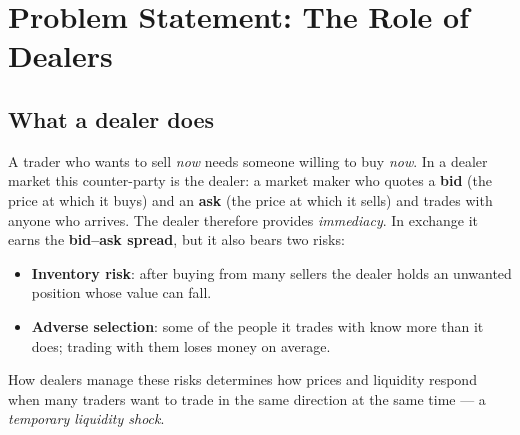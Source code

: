 \documentclass[11pt,a4paper]{article}
\begin{document}
\section{Problem Statement: The Role of Dealers}
\label{sec:problem}

\subsection{What a dealer does}
A trader who wants to sell \emph{now} needs someone willing to buy \emph{now}. In a dealer market this
counter-party is the dealer: a market maker who quotes a \textbf{bid} (the price at which it buys) and an
\textbf{ask} (the price at which it sells) and trades with anyone who arrives. The dealer therefore provides
\emph{immediacy}. In exchange it earns the \textbf{bid--ask spread}, but it also bears two risks:
\begin{itemize}
  \item \textbf{Inventory risk}: after buying from many sellers the dealer holds an unwanted position whose
        value can fall.
  \item \textbf{Adverse selection}: some of the people it trades with know more than it does; trading with
        them loses money on average.
\end{itemize}
How dealers manage these risks determines how prices and liquidity respond when many traders want to trade
in the same direction at the same time --- a \emph{temporary liquidity shock}.
\end{document}
